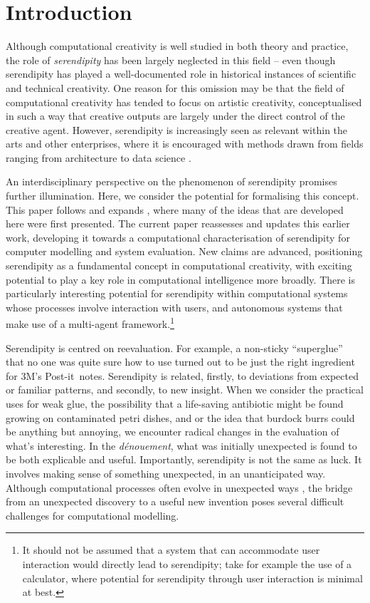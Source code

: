\section{Introduction}

Although computational creativity is well studied in both theory and
practice, the role of \emph{serendipity} has been largely neglected
in this field -- even though serendipity has played a well-documented
role in historical instances of scientific and technical creativity.
One reason for this omission may be that the field of computational
creativity has tended to focus on artistic creativity, conceptualised in such a way that creative outputs are largely under the direct control of the creative agent.  However,  serendipity is increasingly seen as relevant within the arts
\cite{mckay-serendipity} and other enterprises, where it is encouraged with methods drawn from fields ranging from architecture to data science \cite{kakko2009homo,engineering-serendipity}. 


An interdisciplinary perspective on the phenomenon of serendipity
promises further illumination.  Here, we consider the potential for
formalising this concept. 
  This paper follows and expands , where many of the ideas that are developed here were first presented.  The current paper reassesses and updates this earlier work, developing it towards a computational characterisation of serendipity for computer modelling and system evaluation. New claims are advanced, positioning serendipity as a fundamental concept in computational creativity, with exciting potential to play a key role in computational intelligence more broadly.  There is particularly interesting potential for serendipity within computational systems whose processes involve interaction with users, and autonomous systems that make use of a multi-agent framework.\footnote{It should not be assumed that a system that can accommodate user interaction would directly lead to serendipity; take for example the use of a calculator, where potential for serendipity through user interaction is minimal at best.}

Serendipity is centred on reevaluation.  For example, a
non-sticky ``superglue'' that no one was quite sure how to use turned
out to be just the right ingredient for 3M's
Post-it\texttrademark\ notes.
%
Serendipity is related, firstly, to deviations from expected or
familiar patterns, and secondly, to new insight.
%
When we consider the practical uses for weak glue, the possibility
that a life-saving antibiotic might be found growing on contaminated
petri dishes, and or the idea that burdock burrs could be anything but
annoying, we encounter radical changes in the evaluation of what's
interesting.  In the \emph{d\'enouement}, what was initially
unexpected is found to be both explicable and useful.  Importantly,
serendipity is not the same as luck.  It involves making sense of
something unexpected, in an unanticipated way.  Although computational
processes often evolve in unexpected ways
\cite{minsky1967programming}, the bridge from an unexpected discovery
to a useful new invention poses several difficult challenges for
computational modelling.

